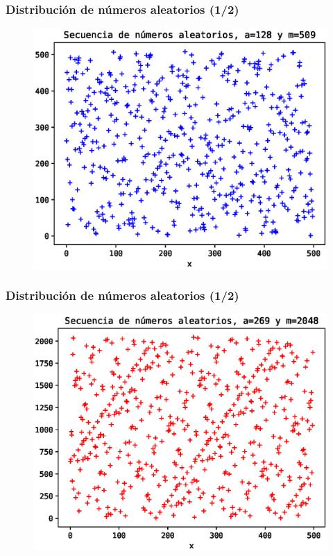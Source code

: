 \documentclass[12pt]{beamer}
\begin{document}
\begin{frame}[fragile]
\frametitle{Distribución de números aleatorios (1/2)}
\begin{figure}
  \centering
  \includegraphics[scale=0.6]{Imagenes/Secuencia_aleatoria_01.eps}
\end{figure}
\end{frame}
\begin{frame}[fragile]
\frametitle{Distribución de números aleatorios (1/2)}
\begin{figure}
  \centering
  \includegraphics[scale=0.6]{Imagenes/Secuencia_aleatoria_02.eps}
\end{figure}
\end{frame}
\end{document}
